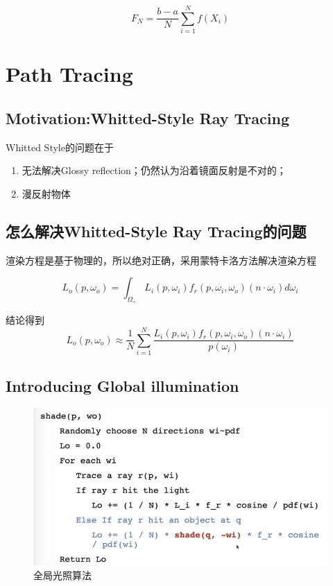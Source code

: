 \begin{equation}
    F_N=\frac{b-a}{N}\sum\limits_{i=1}^{N}f(X_i)
\end{equation}

\section{Path Tracing}

\subsection*{Motivation:Whitted-Style Ray Tracing}
Whitted Style的问题在于
\begin{enumerate}[itemindent=2em]
    \item 无法解决Glossy reflection；仍然认为沿着镜面反射是不对的；
    \item 漫反射物体
\end{enumerate}

\subsection*{怎么解决Whitted-Style Ray Tracing的问题}

渲染方程是基于物理的，所以绝对正确，采用蒙特卡洛方法解决渲染方程

\begin{equation}
    L_o(p,\omega_o)=\int_{\Omega_+}L_i(p,\omega_i)f_r(p,\omega_i,\omega_o)(n\cdot \omega_i)d\omega_i
\end{equation}

结论得到
\begin{equation}
    L_o(p,\omega_o)\approx \frac{1}{N}\sum\limits_{i=1}^{N}\frac{L_i(p,\omega_i)f_r(p,\omega_i,\omega_o)(n\cdot \omega_i)}{p(\omega_i)}
\end{equation}

\subsection*{Introducing Global illumination}
\begin{figure}[H]
    \centering
    \includegraphics[scale=0.5]{figures/全剧光照.png}
    \caption{全局光照算法}
\end{figure}

